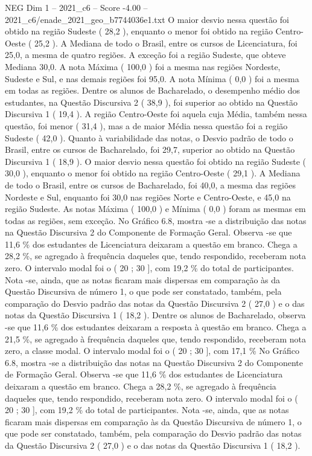 \begin{textsample}{NEG Dim 1 – 2021\_c6 – Score -4.00 – 2021\_c6/enade\_2021\_geo\_b7744036e1.txt}
O maior desvio nessa questão foi obtido na região Sudeste ( 28,2 ), enquanto o menor foi obtido na região Centro-Oeste ( 25,2 ).
A Mediana de todo o Brasil, entre os cursos de Licenciatura, foi 25,0, a mesma de quatro regiões.
A exceção foi a região Sudeste, que obteve Mediana 30,0.
A nota Máxima ( 100,0 ) foi a mesma nas regiões Nordeste, Sudeste e Sul, e nas demais regiões foi 95,0.
A nota Mínima ( 0,0 ) foi a mesma em todas as regiões.
Dentre os alunos de Bacharelado, o desempenho médio dos estudantes, na Questão Discursiva 2 ( 38,9 ), foi superior ao obtido na Questão Discursiva 1 ( 19,4 ).
A região Centro-Oeste foi aquela cuja Média, também nessa questão, foi menor ( 31,4 ), mas a de maior Média nessa questão foi a região Sudeste ( 42,0 ).
Quanto à variabilidade das notas, o Desvio padrão de todo o Brasil, entre os cursos de Bacharelado, foi 29,7, superior ao obtido na Questão Discursiva 1 ( 18,9 ).
O maior desvio nessa questão foi obtido na região Sudeste ( 30,0 ), enquanto o menor foi obtido na região Centro-Oeste ( 29,1 ).
A Mediana de todo o Brasil, entre os cursos de Bacharelado, foi 40,0, a mesma das regiões Nordeste e Sul, enquanto foi 30,0 nas regiões Norte e Centro-Oeste, e 45,0 na região Sudeste.
As notas Máxima ( 100,0 ) e Mínima ( 0,0 ) foram as mesmas em todas as regiões, sem exceção.
No Gráfico 6.8, mostra -se a distribuição das notas na Questão Discursiva 2 do Componente de Formação Geral.
Observa -se que 11,6 \% dos estudantes de Licenciatura deixaram a questão em branco.
Chega a 28,2 \%, se agregado à frequência daqueles que, tendo respondido, receberam nota zero.
O intervalo modal foi o ( 20 ; 30 ], com 19,2 \% do total de participantes.
Nota -se, ainda, que as notas ficaram mais dispersas em comparação às da Questão Discursiva de número 1, o que pode ser constatado, também, pela comparação do Desvio padrão das notas da Questão Discursiva 2 ( 27,0 ) e o das notas da Questão Discursiva 1 ( 18,2 ).
Dentre os alunos de Bacharelado, observa -se que 11,6 \% dos estudantes deixaram a resposta à questão em branco.
Chega a 21,5 \%, se agregado à frequência daqueles que, tendo respondido, receberam nota zero, a classe modal.
O intervalo modal foi o ( 20 ; 30 ], com 17,1 \% No Gráfico 6.8, mostra -se a distribuição das notas na Questão Discursiva 2 do Componente de Formação Geral.
Observa -se que 11,6 \% dos estudantes de Licenciatura deixaram a questão em branco.
Chega a 28,2 \%, se agregado à frequência daqueles que, tendo respondido, receberam nota zero.
O intervalo modal foi o ( 20 ; 30 ], com 19,2 \% do total de participantes.
Nota -se, ainda, que as notas ficaram mais dispersas em comparação às da Questão Discursiva de número 1, o que pode ser constatado, também, pela comparação do Desvio padrão das notas da Questão Discursiva 2 ( 27,0 ) e o das notas da Questão Discursiva 1 ( 18,2 ).

\end{textsample}
